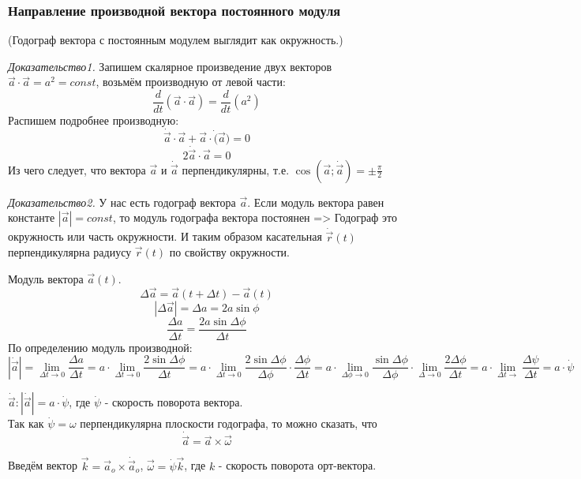 \documentclass{article}
\begin{document}
  \subsubsection{Направление производной вектора постоянного модуля} 
  (Годограф вектора с постоянным модулем выглядит как окружность.)\\
  \par\textit{Доказательство1.} Запишем скалярное произведение двух векторов $\vec{a}\cdot\vec{a} = a^2 = const$, возьмём производную от левой части:
  $$\frac{d}{dt}(\vec{a}\cdot\vec{a}) = \frac{d}{dt}(a^2)$$
  Распишем подробнее производную:
  $$\dot{\vec{a}}\cdot\vec{a} + \vec{a}\cdot\dot(\vec{a}) = 0$$
  $$2\dot{\vec{a}}\cdot\vec{a} = 0$$
  Из чего следует, что вектора $\vec{a}$ и $\dot{\vec{a}}$ перпендикулярны, т.е. $\cos(\vec{a};\dot{\vec{a}}) = \pm\frac{\pi}{2}$\\
  \par\textit{Доказательство2.} У нас есть годограф вектора $\vec{a}$. Если модуль вектора равен константе $|\vec{a}| = const$, то модуль годографа вектора постоянен => Годограф это окружность или часть окружности. И таким образом касательная $\dot{\vec{r}}(t)$ перпендикулярна радиусу $\vec{r}(t)$ по свойству окружности.
  \par Модуль вектора $\vec{a}(t)$.\\
  $$\Delta \vec{a} = \vec{a}(t+\Delta t) - \vec{a}(t)$$
  $$|\Delta \vec{a}| = \Delta a = 2a\sin\phi$$
  $$\frac{\Delta a}{\Delta t} = \frac{2a\sin\Delta\phi}{\Delta t}$$
  По определению модуль производной:
  $$|\dot{\vec{a}}| = \lim_{\Delta t \rightarrow 0}\frac{\Delta a}{\Delta t} = a \cdot \lim_{\Delta t \rightarrow 0}\frac{2\sin\Delta\phi}{\Delta t} = a \cdot \lim_{\Delta t \rightarrow 0}\frac{2\sin\Delta\phi}{\Delta \phi}\cdot\frac{\Delta\phi}{\Delta t} = a\cdot\lim_{\Delta \phi \rightarrow 0}\frac{\sin\Delta\phi}{\Delta\phi}\cdot\lim_{\Delta \rightarrow 0} \frac{2\Delta\phi}{\Delta t} = a \cdot\lim_{\Delta t \rightarrow}\frac{\Delta\psi}{\Delta t} = a\cdot\dot{\psi}$$

  $\dot{\vec{a}}: |\dot{\vec{a}}| = a\cdot\dot{\psi}$, где $\dot{\psi}$ - скорость поворота вектора.\\
  Так как $\dot{\psi} = \omega$ перпендикулярна плоскости годографа, то можно сказать, что
  $$\dot{\vec{a}} = \vec{a}\times\vec{\omega}$$

  Введём вектор $\vec{k} = \vec{a}_{o} \times \dot{\vec{a}}_{o}$, $\vec{\omega} = \dot{\psi}\vec{k}$, где $k$ - скорость поворота орт-вектора.
\end{document}
